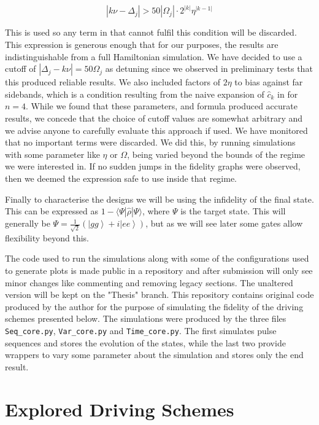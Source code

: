 \documentclass[12pt,twoside]{report}
\begin{document}
\begin{equation}
	|k\nu-\Delta_j| > 50|\Omega_j|\cdot 2^{|k|}\eta^{|k-1|}
	\label{eq:culling}
\end{equation}

This is used so any term in  that cannot fulfil this condition will be discarded. This expression is generous enough that for our purposes, the results are indistinguishable from a full Hamiltonian simulation. We have decided to use a cutoff of $|\Delta_j -k\nu| = 50\Omega_j$ as detuning since we observed in preliminary  tests that this produced reliable results. We also included factors of $2\eta$ to bias against far sidebands, which is a condition resulting from the naive expansion of $\hat{c}_k$ in  for $n=4$. While we found that these parameters, and formula produced accurate results, we concede that the choice of cutoff values are somewhat arbitrary and we advise anyone to carefully evaluate this approach if used. We have monitored that no important terms were discarded. We did this, by running simulations with some parameter like $\eta$ or $\Omega$, being varied beyond the bounds of the regime we were interested in. If no sudden jumps in the fidelity graphs were observed, then we deemed the expression safe to use inside that regime.

Finally to characterise the designs we will be using the infidelity of the final state. This can be expressed as $1-\langle\Psi|\hat{\rho}|\Psi\rangle$, where $\Psi$ is the target state. This will generally be $\Psi = \frac{1}{\sqrt{2}}\left(\left|gg\right\rangle + i\left|ee\right\rangle\right)$, but as we will see later some gates allow flexibility beyond this.

The code used to run the simulations along with some of the configurations used to generate plots is made public in a repository \cite{Github} and after submission will only see minor changes like commenting and removing legacy sections. The unaltered version will be kept on the "Thesis" branch. This repository contains original code produced by the author for the purpose of simulating the fidelity of the driving schemes presented below. The simulations were produced by the three files \texttt{Seq\_core.py}, \texttt{Var\_core.py} and \texttt{Time\_core.py}. The first simulates pulse sequences and stores the evolution of the states, while the last two provide wrappers to vary some parameter about the simulation and stores only the end result.

\chapter{Explored Driving Schemes}
\label{Driving_schemes}
\end{document}
